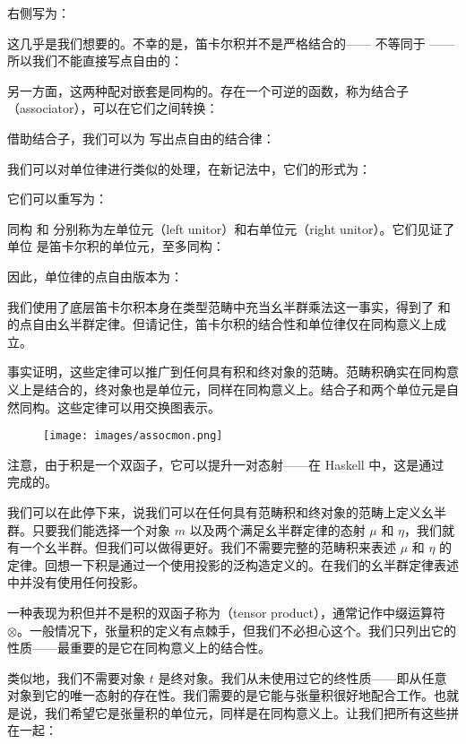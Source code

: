 右侧写为：

这几乎是我们想要的。不幸的是，笛卡尔积并不是严格结合的—— 不等同于 ——所以我们不能直接写点自由的：

另一方面，这两种配对嵌套是同构的。存在一个可逆的函数，称为结合子（associator），可以在它们之间转换：

借助结合子，我们可以为  写出点自由的结合律：

我们可以对单位律进行类似的处理，在新记法中，它们的形式为：

它们可以重写为：

同构  和  分别称为左单位元（left unitor）和右单位元（right unitor）。它们见证了单位 \code{()} 是笛卡尔积的单位元，至多同构：


因此，单位律的点自由版本为：

我们使用了底层笛卡尔积本身在类型范畴中充当幺半群乘法这一事实，得到了  和  的点自由幺半群定律。但请记住，笛卡尔积的结合性和单位律仅在同构意义上成立。

事实证明，这些定律可以推广到任何具有积和终对象的范畴。范畴积确实在同构意义上是结合的，终对象也是单位元，同样在同构意义上。结合子和两个单位元是自然同构。这些定律可以用交换图表示。

\begin{figure}[H]
  \centering
  \texttt{[image: images/assocmon.png]}
\end{figure}

\noindent
注意，由于积是一个双函子，它可以提升一对态射——在 Haskell 中，这是通过  完成的。

我们可以在此停下来，说我们可以在任何具有范畴积和终对象的范畴上定义幺半群。只要我们能选择一个对象 $m$ 以及两个满足幺半群定律的态射 $\mu$ 和 $\eta$，我们就有一个幺半群。但我们可以做得更好。我们不需要完整的范畴积来表述 $\mu$ 和 $\eta$ 的定律。回想一下积是通过一个使用投影的泛构造定义的。在我们的幺半群定律表述中并没有使用任何投影。

一种表现为积但并不是积的双函子称为（tensor product），通常记作中缀运算符 $\otimes$。一般情况下，张量积的定义有点棘手，但我们不必担心这个。我们只列出它的性质——最重要的是它在同构意义上的结合性。

类似地，我们不需要对象 $t$ 是终对象。我们从未使用过它的终性质——即从任意对象到它的唯一态射的存在性。我们需要的是它能与张量积很好地配合工作。也就是说，我们希望它是张量积的单位元，同样是在同构意义上。让我们把所有这些拼在一起：


